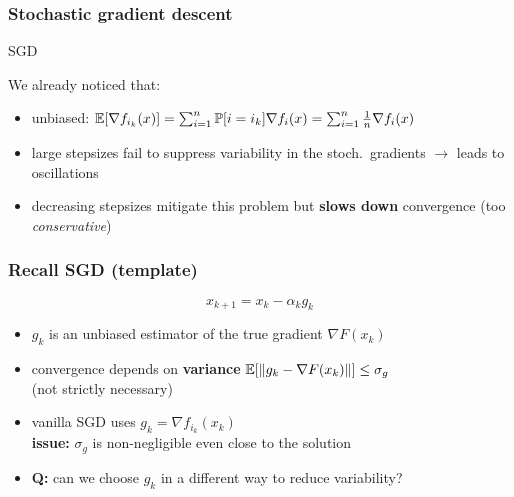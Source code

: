 \documentclass[aspectratio=149]{beamer}
\begin{document}
\begin{frame}
  \frametitle{Stochastic gradient descent}
  \begin{algorithm}[H]
    \caption{SGD}\label{sgd}
    \begin{algorithmic}[1]
      \EndFor{}
    \end{algorithmic}
  \end{algorithm}

  We already noticed that:
  \begin{itemize}
    \item unbiased: $\mathbb{E}[\nabla f_{i_k}(x)] = \sum_{i=1}^{n} \mathbb{P}[i=i_k] \nabla f_i(x) = \sum_{i=1}^{n} \frac{1}{n} \nabla f_i(x)$
    \item large stepsizes fail to suppress variability in the stoch.\ gradients $\rightarrow$ leads to oscillations
    \item decreasing stepsizes mitigate this problem but \textbf{slows down} convergence (too \emph{conservative})
  \end{itemize}

\end{frame}


\begin{frame}
  \frametitle{Recall SGD (template)}
  \begin{equation}
    x_{k+1} = x_k - \alpha_k g_k
  \end{equation}
  \begin{itemize}
    \item $g_k$ is an unbiased estimator of the true gradient $\nabla F(x_k)$
    \item convergence depends on \textbf{variance} $\mathbb{E} [ \Vert g_k - \nabla F(x_k) \Vert ] \le \sigma_g$ \\
          (not strictly necessary)
    \item vanilla SGD uses $g_k = \nabla f_{i_k}(x_k)$ \\
          \textbf{issue:} $\sigma_g$ is non-negligible even close to the solution
    \item \textbf{Q:} can we choose $g_k$ in a different way to reduce variability?
  \end{itemize}

\end{frame}
\end{document}
